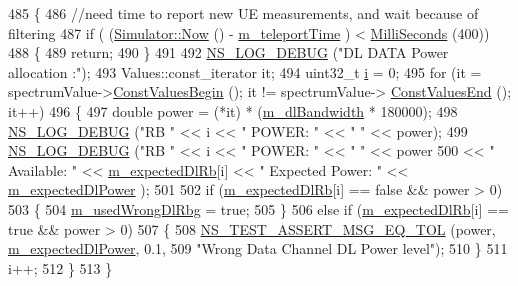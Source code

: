 \begin{DoxyCode}
485 \{
486   \textcolor{comment}{//need time to report new UE measurements, and wait because of filtering}
487   \textcolor{keywordflow}{if} ( (\hyperlink{group__simulator_gac3635e2e87f7ce316c89290ee1b01d0d}{Simulator::Now} () - \hyperlink{classLteFrAreaTestCase_a055d27717dd59f245a2ce57adcb8f201}{m\_teleportTime} ) < 
      \hyperlink{group__timecivil_gaf26127cf4571146b83a92ee18679c7a9}{MilliSeconds} (400))
488     \{
489       \textcolor{keywordflow}{return};
490     \}
491 
492   \hyperlink{group__logging_ga413f1886406d49f59a6a0a89b77b4d0a}{NS\_LOG\_DEBUG} (\textcolor{stringliteral}{"DL DATA Power allocation :"});
493   Values::const\_iterator it;
494   uint32\_t \hyperlink{bernuolliDistribution_8m_a6f6ccfcf58b31cb6412107d9d5281426}{i} = 0;
495   \textcolor{keywordflow}{for} (it = spectrumValue->\hyperlink{classns3_1_1SpectrumValue_aad6900431bd0554b3ba9a00691c2393b}{ConstValuesBegin} (); it != spectrumValue->
      \hyperlink{classns3_1_1SpectrumValue_ab5c2fbde4e06be7c0e4d7a0755c607be}{ConstValuesEnd} (); it++)
496     \{
497       \textcolor{keywordtype}{double} power =  (*it) * (\hyperlink{classLteFrAreaTestCase_a645fc2cea287afbd373f6d702152cf47}{m\_dlBandwidth} * 180000);
498       \hyperlink{group__logging_ga413f1886406d49f59a6a0a89b77b4d0a}{NS\_LOG\_DEBUG} (\textcolor{stringliteral}{"RB "} << i << \textcolor{stringliteral}{" POWER: "} << \textcolor{stringliteral}{" "} << power);
499       \hyperlink{group__logging_ga413f1886406d49f59a6a0a89b77b4d0a}{NS\_LOG\_DEBUG} (\textcolor{stringliteral}{"RB "} << i << \textcolor{stringliteral}{" POWER: "} << \textcolor{stringliteral}{" "} << power
500                           << \textcolor{stringliteral}{" Available: "} << \hyperlink{classLteFrAreaTestCase_a19ab4c52ca163909888b18b2acb25ca8}{m\_expectedDlRb}[i] << \textcolor{stringliteral}{" Expected Power: "} << 
      \hyperlink{classLteFrAreaTestCase_ac5fb6a1bba84f19ef3e4293f504e8084}{m\_expectedDlPower} );
501 
502       \textcolor{keywordflow}{if} (\hyperlink{classLteFrAreaTestCase_a19ab4c52ca163909888b18b2acb25ca8}{m\_expectedDlRb}[i] == \textcolor{keyword}{false} && power > 0)
503         \{
504           \hyperlink{classLteFrAreaTestCase_acf1b825c0fc50c57ac990d11ea1529c0}{m\_usedWrongDlRbg} = \textcolor{keyword}{true};
505         \}
506       \textcolor{keywordflow}{else} \textcolor{keywordflow}{if} (\hyperlink{classLteFrAreaTestCase_a19ab4c52ca163909888b18b2acb25ca8}{m\_expectedDlRb}[i] == \textcolor{keyword}{true} && power > 0)
507         \{
508           \hyperlink{group__testing_ga9e7861b56b4e70db3b56044cb7a28e41}{NS\_TEST\_ASSERT\_MSG\_EQ\_TOL} (power, 
      \hyperlink{classLteFrAreaTestCase_ac5fb6a1bba84f19ef3e4293f504e8084}{m\_expectedDlPower}, 0.1,
509                                      \textcolor{stringliteral}{"Wrong Data Channel DL Power level"});
510         \}
511       i++;
512     \}
513 \}
\end{DoxyCode}


